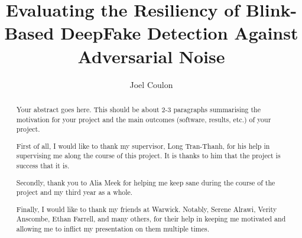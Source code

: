 \documentclass[a4paper]{report}
\author{Joel Coulon}
\title{Evaluating the Resiliency of Blink-Based DeepFake Detection Against Adversarial Noise}
\begin{document}


\pagestyle{plain}

\begin{abstract}
    Your abstract goes here. This should be about 2-3 paragraphs summarising the motivation for your project and the main outcomes (software, results, etc.) of your project. 
\end{abstract}

\renewcommand{\abstractname}{Acknowledgements}
\begin{abstract}
First of all, I would like to thank my supervisor, Long Tran-Thanh, for his help in supervising me along the course of this project. It is thanks to him that the project is success that it is.

Secondly, thank you to Alia Meek for helping me keep sane during the course of the project and my third year as a whole.

Finally, I would like to thank my friends at Warwick. Notably, Serene Alrawi, Verity Anscombe, Ethan Farrell, and many others, for their help in keeping me motivated and allowing me to inflict my presentation on them multiple times.
\end{abstract}

\tableofcontents
\listoffigures
{}
\listofalgorithms
{}
\newpage








\printbibliography

\appendix

\end{document}
